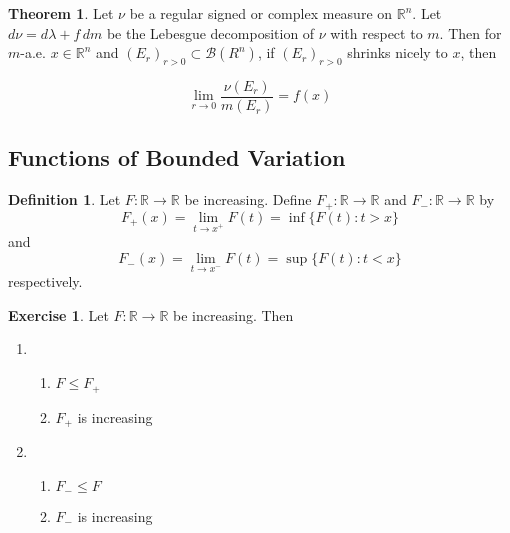 \documentclass[12pt]{amsart}
\theoremstyle{definition}
\newtheorem{defn}[definition]{Definition}
\newtheorem{thm}[definition]{Theorem}
\newtheorem{ex}[definition]{Exercise}
\newcommand{\lam}{\lambda}
\newcommand{\R}{\mathbb{R}}
\newcommand{\MB}{\mathcal{B}}
\newcommand{\dm}{\, d m}
\newcommand{\ld}[1]{\label{defn:#1}}
\begin{document}
	\begin{thm}
		Let $\nu$ be a regular signed or complex measure on $\R^n$. Let $d\nu = d\lam + f \dm$ be the Lebesgue decomposition of $\nu$ with respect to $m$. Then for $m$-a.e. $x \in \R^n$ and $(E_r)_{r >0} \subset \MB(R^n)$, if $(E_r)_{r >0}$ shrinks nicely to $x$, then 
		
		$$\lim_{r \rightarrow 0} \frac{\nu(E_r)}{m(E_r)} = f(x)$$
	\end{thm}
	
	
	
	
	
	
	
	
	
	
	
	
	
	
	
	
	\newpage
	\subsection{Functions of Bounded Variation}
	
	\begin{defn} \ld{00000} 
		Let $F:\R \rightarrow \R$ be increasing. Define $F_+:\R \rightarrow \R$ and $F_-:\R \rightarrow \R$ by $$F_+(x) = \lim_{t \rightarrow x^+}F(t) = \inf \{F(t): t>x \}$$ and $$F_-(x) =  \lim_{t \rightarrow x^-}F(t) = \sup \{F(t): t < x \}$$ respectively.
	\end{defn}
	
	\begin{ex}
		Let $F:\R \rightarrow \R$ be increasing. Then 
		\begin{enumerate}
			\item 
			\begin{enumerate}
				\item $F \leq F_+$
				\item$F_+$ is increasing
			\end{enumerate}
			\item 
			\begin{enumerate}
				\item $F_- \leq F$
				\item $F_-$ is increasing
			\end{enumerate}
		\end{enumerate}
	\end{ex}
\end{document}
